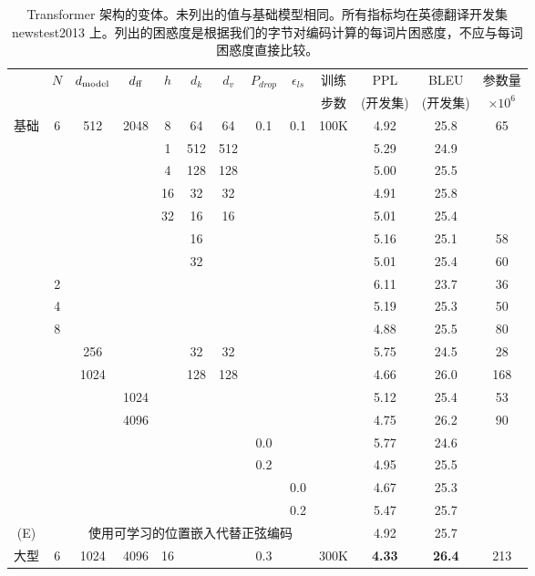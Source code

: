 \begin{table}[t]
\caption{Transformer 架构的变体。未列出的值与基础模型相同。所有指标均在英德翻译开发集 newstest2013 上。列出的困惑度是根据我们的字节对编码计算的每词片困惑度，不应与每词困惑度直接比较。}
\label{tab:variations}
\begin{center}
\vspace{-2mm}
\begin{tabular}{c|ccccccccc|ccc}
\hline\rule{0pt}{2.0ex}
 & \multirow{2}{*}{$N$} & \multirow{2}{*}{$d_{\text{model}}$} &
\multirow{2}{*}{$d_{\text{ff}}$} & \multirow{2}{*}{$h$} & 
\multirow{2}{*}{$d_k$} & \multirow{2}{*}{$d_v$} & 
\multirow{2}{*}{$P_{drop}$} & \multirow{2}{*}{$\epsilon_{ls}$} &
训练 & PPL & BLEU & 参数量 \\
 & & & & & & & & & 步数 & (开发集) & (开发集) & $\times10^6$ \\
\hline\rule{0pt}{2.0ex}
基础 & 6 & 512 & 2048 & 8 & 64 & 64 & 0.1 & 0.1 & 100K & 4.92 & 25.8 & 65 \\
\hline\rule{0pt}{2.0ex}
\multirow{4}{*}{(A)}
& & & & 1 & 512 & 512 & & & & 5.29 & 24.9 &  \\
& & & & 4 & 128 & 128 & & & & 5.00 & 25.5 &  \\
& & & & 16 & 32 & 32 & & & & 4.91 & 25.8 &  \\
& & & & 32 & 16 & 16 & & & & 5.01 & 25.4 &  \\
\hline\rule{0pt}{2.0ex}
\multirow{2}{*}{(B)}
& & & & & 16 & & & & & 5.16 & 25.1 & 58 \\
& & & & & 32 & & & & & 5.01 & 25.4 & 60 \\
\hline\rule{0pt}{2.0ex}
\multirow{7}{*}{(C)}
& 2 & & & & & & & &            & 6.11 & 23.7 & 36 \\
& 4 & & & & & & & &            & 5.19 & 25.3 & 50 \\
& 8 & & & & & & & &            & 4.88 & 25.5 & 80 \\
& & 256 & & & 32 & 32 & & &    & 5.75 & 24.5 & 28 \\
& & 1024 & & & 128 & 128 & & & & 4.66 & 26.0 & 168 \\
& & & 1024 & & & & & &         & 5.12 & 25.4 & 53 \\
& & & 4096 & & & & & &         & 4.75 & 26.2 & 90 \\
\hline\rule{0pt}{2.0ex}
\multirow{4}{*}{(D)}
& & & & & & & 0.0 & & & 5.77 & 24.6 &  \\
& & & & & & & 0.2 & & & 4.95 & 25.5 &  \\
& & & & & & & & 0.0 & & 4.67 & 25.3 &  \\
& & & & & & & & 0.2 & & 5.47 & 25.7 &  \\
\hline\rule{0pt}{2.0ex}
(E) & & \multicolumn{7}{c}{使用可学习的位置嵌入代替正弦编码} & & 4.92 & 25.7 & \\
\hline\rule{0pt}{2.0ex}
大型 & 6 & 1024 & 4096 & 16 & & & 0.3 & & 300K & \textbf{4.33} & \textbf{26.4} & 213 \\
\hline
\end{tabular}
\end{center}
\end{table}

